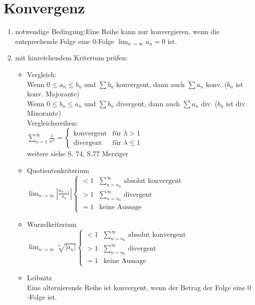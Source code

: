 \section{Konvergenz}
\begin{enumerate}
\item notwendige Bedingung:Eine Reihe kann nur konvergieren, wenn die entsprechende Folge eine $0$-Folge $\lim_{n\to\infty}a_n=0$ ist.
\item mit hinreichendem Kriterium prüfen:
\begin{itemize}
\item Vergleich:\\
Wenn $0\leq a_n\leq b_n$ und $\sum b_n$ konvergent, dann auch $\sum a_n$ konv. ($b_n$ ist konv. Majorante)\\
Wenn $0\leq b_n \leq a_n$ und $\sum b_n$ divergent, dann auch $\sum a_n$ div. ($b_n$ ist div. Minorante)\\
Vergleichsreihen: \\
$\sum_{n=1}^{\infty} \frac{1}{n^\lambda}=\begin{cases}
\text{konvergent} & \text{für }\lambda >1 \\
\text{divergent} & \text{für }\lambda \leq 1 
\end{cases}$\\
weitere siehe S. 74, S.77 Merziger
\item Quotientenkriterium\\
$\lim_{n\to \infty} \left| \frac{a_{n+1}}{a_n}\right|\begin{cases}
<1 & \sum_{n=n_0}^\infty \text{ absolut konvergent}\\
>1 & \sum_{n=n_0}^\infty \text{ divergent}\\
=1 & \text{keine Aussage}
\end{cases}$
\item Wurzelkriterium\\
$\lim_{n\to \infty} \sqrt[n]{|a_n|} \begin{cases}
<1 & \sum_{n=n_0}^\infty \text{ absolut konvergent}\\
>1 & \sum_{n=n_0}^\infty \text{ divergent}\\
=1 & \text{keine Aussage}
\end{cases}$
\item Leibnitz\\
Eine alternierende Reihe ist konvergent, wenn der Betrag der Folge eine $0$-Folge ist.
\end{itemize}
\end{enumerate} 

